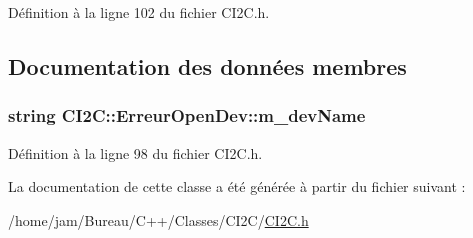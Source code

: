 Définition à la ligne 102 du fichier C\+I2\+C.\+h.



\subsection{Documentation des données membres}
\hypertarget{class_c_i2_c_1_1_erreur_open_dev_a19fcf1034384789940c900e32953e857}{
\subsubsection[{m\+\_\+dev\+Name}]{\setlength{\rightskip}{0pt plus 5cm}string C\+I2\+C\+::\+Erreur\+Open\+Dev\+::m\+\_\+dev\+Name\hspace{0.3cm}{\ttfamily [private]}}}\label{class_c_i2_c_1_1_erreur_open_dev_a19fcf1034384789940c900e32953e857}


Définition à la ligne 98 du fichier C\+I2\+C.\+h.



La documentation de cette classe a été générée à partir du fichier suivant \+:\begin{DoxyCompactItemize}
\item 
/home/jam/\+Bureau/\+C++/\+Classes/\+C\+I2\+C/\hyperlink{_c_i2_c_8h}{C\+I2\+C.\+h}\end{DoxyCompactItemize}
